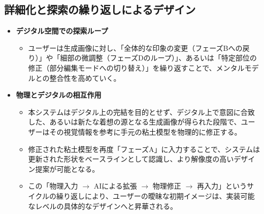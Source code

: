 \documentclass[dvipdfmx]{jlreq}
\begin{document}



\subsection{詳細化と探索の繰り返しによるデザイン}
\begin{itemize}
  \item \textbf{デジタル空間での探索ループ}
  \begin{itemize}
    \item ユーザーは生成画像に対し、「全体的な印象の変更（フェーズBへの戻り）」や「細部の微調整（フェーズDのループ）」、あるいは「特定部位の修正（部分編集モードへの切り替え）」を繰り返すことで、メンタルモデルとの整合性を高めていく。
  \end{itemize}

  \item \textbf{物理とデジタルの相互作用}
  \begin{itemize}
    \item 本システムはデジタル上の完結を目的とせず、デジタル上で意図に合致した、あるいは新たな着想の源となる生成画像が得られた段階で、ユーザーはその視覚情報を参考に手元の粘土模型を物理的に修正する。
    \item 修正された粘土模型を再度「フェーズA」に入力することで、システムは更新された形状をベースラインとして認識し、より解像度の高いデザイン提案が可能となる。
    \item この「物理入力 $\to$ AIによる拡張 $\to$ 物理修正 $\to$ 再入力」というサイクルの繰り返しにより、ユーザーの曖昧な初期イメージは、実装可能なレベルの具体的なデザインへと昇華される。
  \end{itemize}
\end{itemize}
\end{document}
